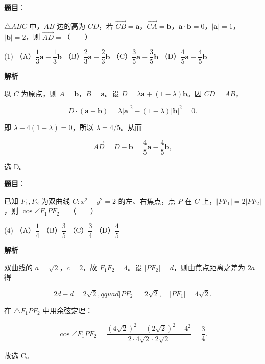 \begin{answer}

\textbf{题目}：

$\triangle ABC$ 中，$AB$ 边的高为 $CD$，若 $\overrightarrow{CB}=\boldsymbol a$，$\overrightarrow{CA}=\boldsymbol b$，$\boldsymbol a\cdot\boldsymbol b=0$，$|\boldsymbol a|=1$，$|\boldsymbol b|=2$，则 $\overrightarrow{AD}=$\mbox{（　　）}

\begin{gkopts}(1)
\task （A）$\dfrac13\boldsymbol a-\dfrac13\boldsymbol b$
\task （B）$\dfrac23\boldsymbol a-\dfrac23\boldsymbol b$
\task （C）$\dfrac35\boldsymbol a-\dfrac35\boldsymbol b$
\task （D）$\dfrac45\boldsymbol a-\dfrac45\boldsymbol b$
\end{gkopts}

\textbf{解析}

以 $C$ 为原点，则 $A=\boldsymbol b$，$B=\boldsymbol a$。设 $D=\lambda\boldsymbol a+(1-\lambda)\boldsymbol b$。因 $CD\perp AB$，

\nopagebreak[4]
\[
D\cdot(\boldsymbol a-\boldsymbol b)=\lambda|\boldsymbol a|^2-(1-\lambda)|\boldsymbol b|^2=0.
\]

即 $\lambda-4(1-\lambda)=0$，所以 $\lambda=4/5$。从而

\nopagebreak[4]
\[
\overrightarrow{AD}=D-\boldsymbol b=\frac45\boldsymbol a-\frac45\boldsymbol b,
\]

选 D。


\end{answer}
\begin{answer}

\textbf{题目}：

已知 $F_1,F_2$ 为双曲线 $C:x^2-y^2=2$ 的左、右焦点，点 $P$ 在 $C$ 上，$|PF_1|=2|PF_2|$，则 $\cos\angle F_1PF_2=$\mbox{（　　）}

\begin{gkopts}(4)
\task （A）$\dfrac14$
\task （B）$\dfrac35$
\task （C）$\dfrac34$
\task （D）$\dfrac45$
\end{gkopts}

\textbf{解析}

双曲线的 $a=\sqrt2$，$c=2$，故 $F_1F_2=4$。设 $|PF_2|=d$，则由焦点距离之差为 $2a$ 得

\nopagebreak[4]
\[
2d-d=2\sqrt2,qquad |PF_2|=2\sqrt2,\quad |PF_1|=4\sqrt2.
\]

在 $\triangle F_1PF_2$ 中用余弦定理：

\nopagebreak[4]
\[
\cos\angle F_1PF_2=
\frac{(4\sqrt2)^2+(2\sqrt2)^2-4^2}{2\cdot4\sqrt2\cdot2\sqrt2}=\frac34.
\]

故选 C。


\end{answer}
